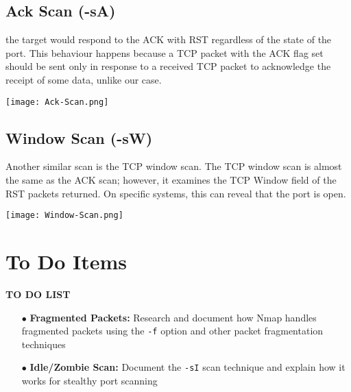 \documentclass[11pt,a4paper]{article}
\begin{document}
\clearpage

\subsection{Ack Scan (-sA)}
the target would respond to the ACK with RST regardless of the state
of the port. This behaviour happens because a TCP packet with the ACK
flag set should be sent only in response to a received TCP packet to
acknowledge the receipt of some data, unlike our case.

\begin{center}
  \texttt{[image: Ack-Scan.png]}
  \label{fig:Ack-Scan}
\end{center}

\subsection{Window Scan (-sW)}
Another similar scan is the TCP window scan. The TCP window scan is
almost the same as the ACK scan; however, it examines the TCP Window
field of the RST packets returned. On specific systems, this can
reveal that the port is open.

\begin{center}
  \texttt{[image: Window-Scan.png]}
  \label{fig:Ack-Scan}
\end{center}
\section{To Do Items}

\begin{tcolorbox}[colback=sectioncolor!20, colframe=sectioncolor,
  width=\textwidth]
  \begin{center}
    \Large\textbf{TO DO LIST}
  \end{center}

  \begin{itemize}
    \item[\textcolor{warningcolor}{$\bullet$}] \textbf{Fragmented Packets:}
      Research and document how Nmap handles fragmented packets using
      the \texttt{-f} option
      and other packet fragmentation techniques

    \item[\textcolor{warningcolor}{$\bullet$}] \textbf{Idle/Zombie Scan:}
      Document the \texttt{-sI} scan technique and explain how it
      works for stealthy port scanning
  \end{itemize}
\end{tcolorbox}
\end{document}
